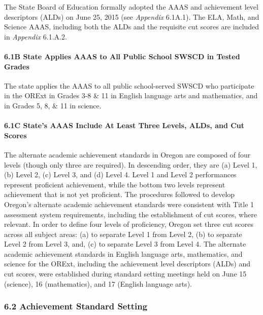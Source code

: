 \documentclass[]{article}
\let\oldparagraph\paragraph
\renewcommand{\paragraph}[1]{\oldparagraph{#1}\mbox{}}
\begin{document}
The State Board of Education formally adopted the AAAS and achievement
level descriptors (ALDs) on June 25, 2015 (see \emph{Appendix} 6.1A.1).
The ELA, Math, and Science AAAS, including both the ALDs and the
requisite cut scores are included in \emph{Appendix} 6.1.A.2.

\paragraph{6.1B State Applies AAAS to All Public School SWSCD in Tested
Grades}\label{b-state-applies-aaas-to-all-public-school-swscd-in-tested-grades}

The state applies the AAAS to all public school-served SWSCD who
participate in the ORExt in Grades 3-8 \& 11 in English language arts
and mathematics, and in Grades 5, 8, \& 11 in science.

\paragraph{6.1C State's AAAS Include At Least Three Levels, ALDs, and
Cut
Scores}\label{c-states-aaas-include-at-least-three-levels-alds-and-cut-scores}

The alternate academic achievement standards in Oregon are composed of
four levels (though only three are required). In descending order, they
are (a) Level 1, (b) Level 2, (c) Level 3, and (d) Level 4. Level 1 and
Level 2 performances represent proficient achievement, while the bottom
two levels represent achievement that is not yet proficient. The
procedures followed to develop Oregon's alternate academic achievement
standards were consistent with Title 1 assessment system requirements,
including the establishment of cut scores, where relevant. In order to
define four levels of proficiency, Oregon set three cut scores across
all subject areas: (a) to separate Level 1 from Level 2, (b) to separate
Level 2 from Level 3, and, (c) to separate Level 3 from Level 4. The
alternate academic achievement standards in English language arts,
mathematics, and science for the ORExt, including the achievement level
descriptors (ALDs) and cut scores, were established during standard
setting meetings held on June 15 (science), 16 (mathematics), and 17
(English language arts).

\subsubsection{6.2 Achievement Standard
Setting}\label{achievement-standard-setting}
\end{document}
